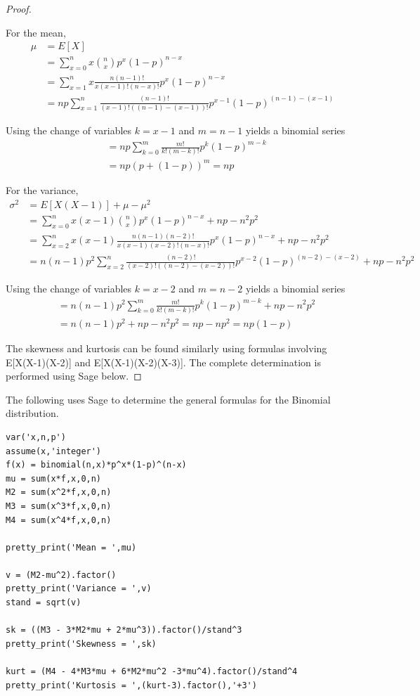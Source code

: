 \documentclass[10pt,]{book}
\theoremstyle{plain}
\theoremstyle{definition}
\theoremstyle{definition}
\theoremstyle{definition}
\numberwithin{equation}{section}
\begin{document}
\begin{proof}\hypertarget{proof-35}{}
For the mean,
		\begin{align*}
 \mu & = E[X] \\
 & = \sum_{x=0}^{n} {x \binom{n}{x} p^x (1-p)^{n-x}}\\
 & = \sum_{x=1}^{n} {x \frac{n(n-1)!}{x(x-1)!(n-x)!} p^x (1-p)^{n-x}}\\
 & = np \sum_{x=1}^{n} {\frac{(n-1)!}{(x-1)!((n-1)-(x-1))!} p^{x-1} (1-p)^{(n-1)-(x-1)}}
\end{align*}

		Using the change of variables \(k=x-1\) and \(m = n-1\) yields a binomial series
		\begin{align*}
 & = np \sum_{k=0}^{m} {\frac{m!}{k!(m-k)!} p^k (1-p)^{m-k}}\\
 & = np (p + (1-p))^m = np
\end{align*}
\par
For the variance,
		\begin{align*}
 \sigma^2 & = E[X(X-1)] + \mu - \mu^2 \\
 & = \sum_{x=0}^{n} {x(x-1) \binom{n}{x} p^x (1-p)^{n-x}} + np - n^2p^2\\
 & = \sum_{x=2}^{n} {x(x-1) \frac{n(n-1)(n-2)!}{x(x-1)(x-2)!(n-x)!} p^x (1-p)^{n-x}}  + np - n^2p^2\\
 & = n(n-1)p^2 \sum_{x=2}^{n} {\frac{(n-2)!}{(x-2)!((n-2)-(x-2))!} p^{x-2} (1-p)^{(n-2)-(x-2)}} + np - n^2p^2
\end{align*}
\par
Using the change of variables \(k=x-2\) and \(m = n-2\) yields a binomial series
	\begin{align*}
 & = n(n-1)p^2  \sum_{k=0}^{m} {\frac{m!}{k!(m-k)!} p^k (1-p)^{m-k}} + np - n^2p^2\\
 & = n(n-1)p^2 + np - n^2p^2 = np - np^2 = np(1-p)
\end{align*}
\par
The skewness and kurtosis can be found similarly using formulas involving E[X(X-1)(X-2)] and E[X(X-1)(X-2)(X-3)]. The complete determination is performed using Sage below.
\end{proof}
\par
The following uses Sage to determine the general formulas for the Binomial distribution.
%
\begin{lstlisting}[style=sageinput]
var('x,n,p')
assume(x,'integer')
f(x) = binomial(n,x)*p^x*(1-p)^(n-x)
mu = sum(x*f,x,0,n)
M2 = sum(x^2*f,x,0,n)
M3 = sum(x^3*f,x,0,n)
M4 = sum(x^4*f,x,0,n)

pretty_print('Mean = ',mu)

v = (M2-mu^2).factor()
pretty_print('Variance = ',v)
stand = sqrt(v)

sk = ((M3 - 3*M2*mu + 2*mu^3)).factor()/stand^3
pretty_print('Skewness = ',sk)

kurt = (M4 - 4*M3*mu + 6*M2*mu^2 -3*mu^4).factor()/stand^4
pretty_print('Kurtosis = ',(kurt-3).factor(),'+3')
\end{lstlisting}
\end{document}
